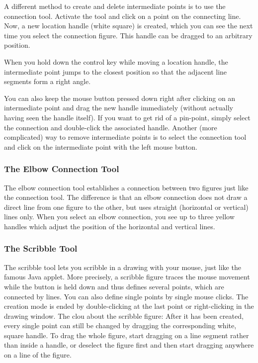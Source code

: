 A different method to create and delete intermediate points is to use the
connection tool.
Activate the tool and click on a
point on the connecting line. Now, a new location handle (white square)
is created, which you can see the next time you select the connection figure.
This handle can be dragged to an arbitrary position.

When you hold down the control key while moving a location
handle, the intermediate point
jumps to the closest position so that the adjacent line segments
form a right angle.

You can also keep the mouse button pressed down right after clicking
on an intermediate point and drag the new handle immediately (without actually
having seen the handle itself).
If you want to get rid of a pin-point, simply
select the connection and double-click the associated handle.
Another (more complicated) way to remove intermediate points is to select
the connection tool and click on the intermediate point with the left mouse
button.


\subsubsection{The Elbow Connection Tool}

The elbow connection tool establishes a connection between two
figures just like the connection tool.
The difference is that an elbow connection does not draw a direct
line from one figure to the other, but uses straight (horizontal
or vertical) lines only.
When you select an elbow connection, you see up to three yellow
handles which adjust the position of the horizontal and vertical
lines.


\subsubsection{The Scribble Tool}

The scribble tool lets you scribble in a drawing
with your mouse, just like the famous Java applet.
More precisely, a scribble figure traces the mouse movement while the
button is held down and thus defines several points, which are connected
by lines. You can also define single points by single mouse clicks.
The creation mode is ended by double-clicking at the last point or 
right-clicking in the drawing window. 
The clou about the scribble figure: After it has been
created, every single point can still be changed by dragging the
corresponding white, square handle.
To drag the whole figure, start dragging on a
line segment rather than inside a handle, or deselect the figure first
and then start dragging anywhere on a line of the figure.

